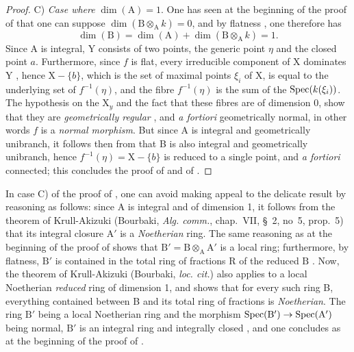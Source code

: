 \begin{proof}
C) \emph{Case where} $\dim(\mathrm{A})=1$.
One has seen at the beginning of the proof of  that one can suppose $\dim(\mathrm{B}\otimes_{\mathrm{A}}k)=0$, and by flatness , one therefore has
\[
  \dim(\mathrm{B})=\dim(\mathrm{A})+\dim(\mathrm{B}\otimes_{\mathrm{A}}k)=1.
\]
Since A is integral, Y consists of two points, the generic point $\eta$ and the closed point $a$.
Furthermore, since $f$ is flat, every irreducible component of X dominates Y , hence $\mathrm{X}-\{b\}$, which is the set of maximal points $\xi_i$ of X, is equal to
the underlying set of $f^{-1}(\eta)$, and the fibre $f^{-1}(\eta)$ is the sum of the $\operatorname{Spec}(k(\xi_i))$.
The hypothesis on the $\mathrm{X}_y$ and the fact that these fibres are of dimension 0, show that they are \emph{geometrically regular} , and \emph{a fortiori} geometrically normal, in other words $f$ is a \emph{normal morphism}.
But since A is integral and geometrically unibranch, it follows then from  that B is also integral and geometrically unibranch, hence $f^{-1}(\eta)=\mathrm{X}-\{b\}$ is reduced to a single point, and \emph{a fortiori} connected;
this concludes the proof of  and of .
\end{proof}

\begin{remark}[18.9.7.8]
\label{IV.18.9.7.8}
In case C) of the proof of , one can avoid making appeal to the delicate result  by reasoning as follows:
since A is integral and of dimension 1, it follows from the theorem of Krull-Akizuki (Bourbaki, \emph{Alg. comm.}, chap.~VII, \S~2, no~5, prop.~5) that its integral closure $\mathrm{A}'$ is a \emph{Noetherian} ring.
The same reasoning as at the beginning of the proof of  shows that $\mathrm{B}'=\mathrm{B}\otimes_{\mathrm{A}}\mathrm{A}'$ is a local ring;
furthermore, by flatness, $\mathrm{B}'$ is contained in the total ring of fractions R of the reduced $\mathrm{B}$ .
Now, the theorem of Krull-Akizuki (Bourbaki, \emph{loc. cit.}) also applies to a local Noetherian \emph{reduced} ring of dimension 1, and shows that for every such ring B, everything contained between B and its total ring of fractions is \emph{Noetherian}.
The ring $\mathrm{B}'$ being a local Noetherian ring and the morphism $\operatorname{Spec}(\mathrm{B}')\to\operatorname{Spec}(\mathrm{A}')$ being normal, $\mathrm{B}'$ is an integral ring and integrally closed , and one concludes as at the beginning of the proof of .
\end{remark}

